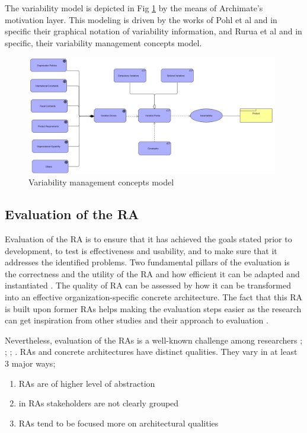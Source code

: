 \documentclass[review]{elsarticle}
\begin{document}
The variability model is depicted in Fig \ref{variability} by the means of Archimate's motivation layer. This modeling is driven by the works of Pohl et al \cite{pohl2005software} and in specific their graphical notation of variability information, and Rurua et al \cite{rurua2019representing} and in specific, their variability management concepts model.

\begin{figure}[h!]
    \centering
    \includegraphics[width=11cm]{variability-model.JPG}
    \caption{Variability management concepts model}
    \label{variability}
\end{figure}

\subsection{Evaluation of the RA}

Evaluation of the RA is to ensure that it has achieved the goals stated prior to development, to test is effectiveness and usability, and to make sure that it addresses the identified problems. Two fundamental pillars of the evaluation is the correctness and the utility of the RA and how efficient it can be adapted and instantiated \cite{galster2011empirically}. The quality of RA can be assessed by how it can be transformed into an effective organization-specific concrete architecture. The fact that this RA is built upon former RAs helps making the evaluation steps easier as the research can get inspiration from other studies and their approach to evaluation \cite{sharpe2019industrial}. 

Nevertheless, evaluation of the RAs is a well-known challenge among researchers \cite{angelov2008contracting}; \cite{Avgeriou}; \cite{Cioroaica}; \cite{Maier}. RAs and concrete architectures have distinct qualities. They vary in at least 3 major ways; 

\begin{enumerate}
    \item RAs are of higher level of abstraction 
    \item in RAs stakeholders are not clearly grouped 
    \item RAs tend to be focused more on architectural qualities
\end{enumerate}
\end{document}
